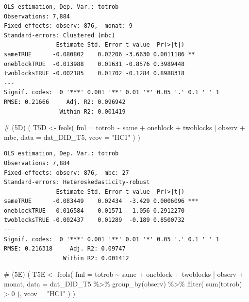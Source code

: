 \documentclass[
  a4paper,
  DIV=11,
  oneside]{scrreprt}
\newenvironment{Shaded}{\begin{snugshade}}{\end{snugshade}}
\newcommand{\AttributeTok}[1]{\textcolor[rgb]{0.40,0.45,0.13}{#1}}
\newcommand{\CommentTok}[1]{\textcolor[rgb]{0.37,0.37,0.37}{#1}}
\newcommand{\DecValTok}[1]{\textcolor[rgb]{0.68,0.00,0.00}{#1}}
\newcommand{\FunctionTok}[1]{\textcolor[rgb]{0.28,0.35,0.67}{#1}}
\newcommand{\NormalTok}[1]{\textcolor[rgb]{0.00,0.23,0.31}{#1}}
\newcommand{\OtherTok}[1]{\textcolor[rgb]{0.00,0.23,0.31}{#1}}
\newcommand{\SpecialCharTok}[1]{\textcolor[rgb]{0.37,0.37,0.37}{#1}}
\newcommand{\StringTok}[1]{\textcolor[rgb]{0.13,0.47,0.30}{#1}}
\begin{document}
\begin{verbatim}
OLS estimation, Dep. Var.: totrob
Observations: 7,884
Fixed-effects: observ: 876,  monat: 9
Standard-errors: Clustered (mbc) 
               Estimate Std. Error t value  Pr(>|t|)    
sameTRUE      -0.080802    0.02206 -3.6630 0.0011186 ** 
oneblockTRUE  -0.013988    0.01631 -0.8576 0.3989448    
twoblocksTRUE -0.002185    0.01702 -0.1284 0.8988318    
---
Signif. codes:  0 '***' 0.001 '**' 0.01 '*' 0.05 '.' 0.1 ' ' 1
RMSE: 0.21666     Adj. R2: 0.096942
                Within R2: 0.001419
\end{verbatim}

\begin{Shaded}
\begin{Highlighting}[]
\CommentTok{\# (5D)}
\NormalTok{(}
\NormalTok{  T5D }\OtherTok{\textless{}{-}} \FunctionTok{feols}\NormalTok{(}
    \AttributeTok{fml =}\NormalTok{ totrob }\SpecialCharTok{\textasciitilde{}} 
\NormalTok{      same }
    \SpecialCharTok{+}\NormalTok{ oneblock }
    \SpecialCharTok{+}\NormalTok{ twoblocks }
    \SpecialCharTok{|}\NormalTok{ observ }\SpecialCharTok{+}\NormalTok{ mbc,}
    \AttributeTok{data =}\NormalTok{ dat\_DID\_T5,}
    \AttributeTok{vcov =} \StringTok{"HC1"}
\NormalTok{  )}
\NormalTok{)}
\end{Highlighting}
\end{Shaded}

\begin{verbatim}
OLS estimation, Dep. Var.: totrob
Observations: 7,884
Fixed-effects: observ: 876,  mbc: 27
Standard-errors: Heteroskedasticity-robust 
               Estimate Std. Error t value  Pr(>|t|)    
sameTRUE      -0.083449    0.02434  -3.429 0.0006096 ***
oneblockTRUE  -0.016584    0.01571  -1.056 0.2912270    
twoblocksTRUE -0.002437    0.01289  -0.189 0.8500732    
---
Signif. codes:  0 '***' 0.001 '**' 0.01 '*' 0.05 '.' 0.1 ' ' 1
RMSE: 0.216318     Adj. R2: 0.09747 
                 Within R2: 0.001412
\end{verbatim}

\begin{Shaded}
\begin{Highlighting}[]
\CommentTok{\# (5E)}
\NormalTok{(}
\NormalTok{  T5E }\OtherTok{\textless{}{-}} \FunctionTok{feols}\NormalTok{(}
    \AttributeTok{fml =}\NormalTok{ totrob }\SpecialCharTok{\textasciitilde{}} 
\NormalTok{      same}
    \SpecialCharTok{+}\NormalTok{ oneblock}
    \SpecialCharTok{+}\NormalTok{ twoblocks}
    \SpecialCharTok{|}\NormalTok{ observ }\SpecialCharTok{+}\NormalTok{ monat,}
    \AttributeTok{data =}\NormalTok{ dat\_DID\_T5 }\SpecialCharTok{\%\textgreater{}\%} 
      \FunctionTok{group\_by}\NormalTok{(observ) }\SpecialCharTok{\%\textgreater{}\%} 
      \FunctionTok{filter}\NormalTok{(}
        \FunctionTok{sum}\NormalTok{(totrob) }\SpecialCharTok{\textgreater{}} \DecValTok{0}
\NormalTok{      ),}
    \AttributeTok{vcov =} \StringTok{"HC1"}
\NormalTok{  )}
\NormalTok{)}
\end{Highlighting}
\end{Shaded}
\end{document}
